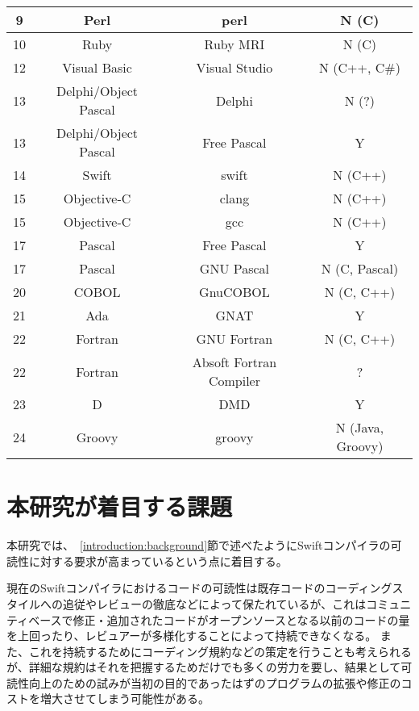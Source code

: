 \begin{table}[hb]
\begin{center}
\begin{tabular}{|c|c|c|c|}
            9 & Perl & perl & N (C) \\
            \hline
            10 & Ruby & Ruby MRI & N (C) \\
            \hline
            12 & Visual Basic & Visual Studio & N (C++, C\#) \\
            \hline
            13 & Delphi/Object Pascal & Delphi & N (?) \\
            \hline
            13 & Delphi/Object Pascal & Free Pascal & Y \\
            \hline
            14 & Swift & swift & N (C++) \\
            \hline
            15 & Objective-C & clang & N (C++) \\
            \hline
            15 & Objective-C & gcc & N (C++) \\
            \hline
            17 & Pascal & Free Pascal & Y \\
            \hline
            17 & Pascal & GNU Pascal & N (C, Pascal) \\
            \hline
            20 & COBOL & GnuCOBOL & N (C, C++) \\
            \hline
            21 & Ada & GNAT & Y \\
            \hline
            22 & Fortran & GNU Fortran & N (C, C++) \\
            \hline
            22 & Fortran & Absoft Fortran Compiler & ? \\
            \hline
            23 & D & DMD & Y \\
            \hline
            24 & Groovy & groovy & N (Java, Groovy) \\
            \hline
        \end{tabular}
        \label{table:bootstrapping-languages}
    \end{center}
\end{table}


\section{本研究が着目する課題}
\label{introduction:issue}

本研究では、~\ref{introduction:background}節で述べたようにSwiftコンパイラの可読性に対する要求が高まっているという点に着目する。

現在のSwiftコンパイラにおけるコードの可読性は既存コードのコーディングスタイルへの追従やレビューの徹底などによって保たれているが、これはコミュニティベースで修正・追加されたコードがオープンソースとなる以前のコードの量を上回ったり、レビュアーが多様化することによって持続できなくなる。
また、これを持続するためにコーディング規約などの策定を行うことも考えられるが、詳細な規約はそれを把握するためだけでも多くの労力を要し、結果として可読性向上のための試みが当初の目的であったはずのプログラムの拡張や修正のコストを増大させてしまう可能性がある。


